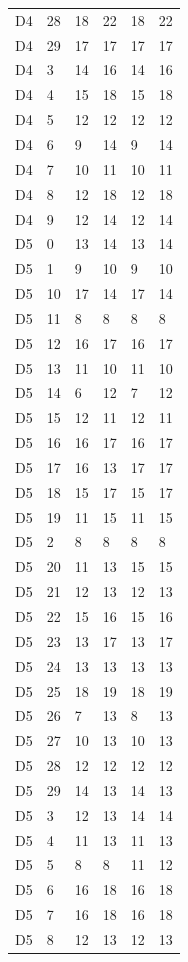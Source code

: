 \begin{longtable}{llllll}
D4 & 28 & 18 & 22 & 18 & 22 \\
D4 & 29 & 17 & 17 & 17 & 17 \\
D4 & 3 & 14 & 16 & 14 & 16 \\
D4 & 4 & 15 & 18 & 15 & 18 \\
D4 & 5 & 12 & 12 & 12 & 12 \\
D4 & 6 & 9 & 14 & 9 & 14 \\
D4 & 7 & 10 & 11 & 10 & 11 \\
D4 & 8 & 12 & 18 & 12 & 18 \\
D4 & 9 & 12 & 14 & 12 & 14 \\
D5 & 0 & 13 & 14 & 13 & 14 \\
D5 & 1 & 9 & 10 & 9 & 10 \\
D5 & 10 & 17 & 14 & 17 & 14 \\
D5 & 11 & 8 & 8 & 8 & 8 \\
D5 & 12 & 16 & 17 & 16 & 17 \\
D5 & 13 & 11 & 10 & 11 & 10 \\
D5 & 14 & 6 & 12 & 7 & 12 \\
D5 & 15 & 12 & 11 & 12 & 11 \\
D5 & 16 & 16 & 17 & 16 & 17 \\
D5 & 17 & 16 & 13 & 17 & 17 \\
D5 & 18 & 15 & 17 & 15 & 17 \\
D5 & 19 & 11 & 15 & 11 & 15 \\
D5 & 2 & 8 & 8 & 8 & 8 \\
D5 & 20 & 11 & 13 & 15 & 15 \\
D5 & 21 & 12 & 13 & 12 & 13 \\
D5 & 22 & 15 & 16 & 15 & 16 \\
D5 & 23 & 13 & 17 & 13 & 17 \\
D5 & 24 & 13 & 13 & 13 & 13 \\
D5 & 25 & 18 & 19 & 18 & 19 \\
D5 & 26 & 7 & 13 & 8 & 13 \\
D5 & 27 & 10 & 13 & 10 & 13 \\
D5 & 28 & 12 & 12 & 12 & 12 \\
D5 & 29 & 14 & 13 & 14 & 13 \\
D5 & 3 & 12 & 13 & 14 & 14 \\
D5 & 4 & 11 & 13 & 11 & 13 \\
D5 & 5 & 8 & 8 & 11 & 12 \\
D5 & 6 & 16 & 18 & 16 & 18 \\
D5 & 7 & 16 & 18 & 16 & 18 \\
D5 & 8 & 12 & 13 & 12 & 13 \\

\end{longtable}
